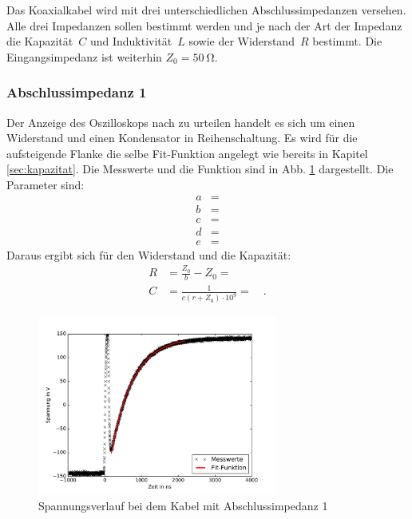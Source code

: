 Das Koaxialkabel wird mit drei unterschiedlichen Abschlussimpedanzen versehen. Alle drei Impedanzen sollen bestimmt werden und je nach der Art der Impedanz die Kapazität~$C$ und Induktivität~$L$ sowie der Widerstand~$R$ bestimmt. Die Eingangsimpedanz ist weiterhin $Z_0 = \SI{50}{\ohm}$.

\subsubsection{Abschlussimpedanz 1}
Der Anzeige des Oszilloskops nach zu urteilen handelt es sich um einen Widerstand und einen Kondensator in Reihenschaltung. Es wird für die aufsteigende Flanke die selbe Fit-Funktion angelegt wie bereits in Kapitel \ref{sec:kapazitat}. Die Messwerte und die Funktion sind in Abb. \ref{fig:box25} dargestellt. Die Parameter sind:
\begin{align}
	a &=  \\
	b &=  \\
	c &=  \\
	d &=  \\
	e &=  
\end{align}
Daraus ergibt sich für den Widerstand und die Kapazität:
\begin{align}
	R &= \frac{Z_0}{b} - Z_0 =  \\
	C &= \frac{1}{ c (r + Z_0) \cdot 10^9} =  \quad.
\end{align}


\begin{figure}
	\centering
	\includegraphics[width=0.7\textwidth]{Box25/Box25.pdf}
	\caption{Spannungsverlauf bei dem Kabel mit Abschlussimpedanz 1}
	\label{fig:box25}
\end{figure}

